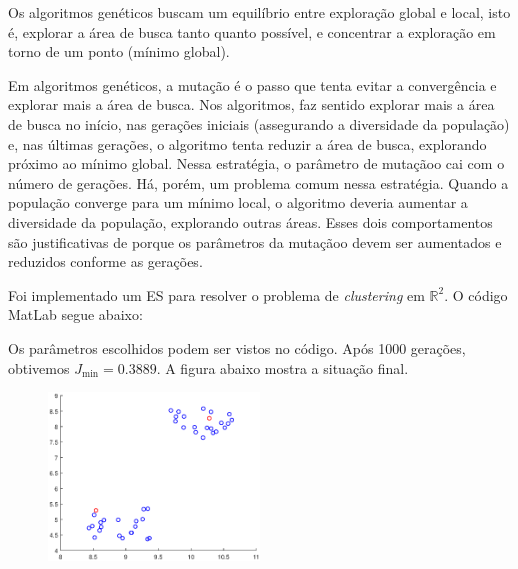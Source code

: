 \documentclass[12pt]{article}
\newenvironment{exercise}[2][Exercício]{\begin{trivlist}
\item[\hskip \labelsep {\bfseries #1}\hskip \labelsep {\bfseries #2.}]}{\end{trivlist}}
\begin{document}
\begin{exercise}{3}

Os algoritmos genéticos buscam um equilíbrio entre exploração global e local,
isto é, explorar a área de busca tanto quanto possível, e concentrar a
exploração em torno de um ponto (mínimo global).

Em algoritmos genéticos, a mutação é o passo que tenta evitar a convergência e
explorar mais a área de busca. Nos algoritmos, faz sentido explorar mais a
área de busca no início, nas gerações iniciais (assegurando a diversidade da
população) e, nas últimas gerações, o algoritmo tenta reduzir a área de busca,
explorando próximo ao mínimo global. Nessa estratégia, o parâmetro de mutaçãoo
cai com o número de gerações. Há, porém, um problema comum nessa estratégia.
Quando a população converge para um mínimo local, o algoritmo deveria aumentar
a diversidade da população, explorando outras áreas. Esses dois comportamentos
são justificativas de porque os parâmetros da mutaçãoo devem ser aumentados e
reduzidos conforme as gerações.
\end{exercise}

\begin{exercise}{4}
Foi implementado um ES para resolver o problema de \textit{clustering} em
$\mathbb{R}^2$. O código MatLab segue abaixo:


Os parâmetros escolhidos podem ser vistos no código. Após 1000 gerações,
obtivemos $J_{\text{min}}=0.3889$. A figura abaixo mostra a situação final.

\begin{figure}[H]
    \centering
    \includegraphics[width=0.5\textwidth]{figs/cluster.eps}
\end{figure}

\end{exercise}
\end{document}
